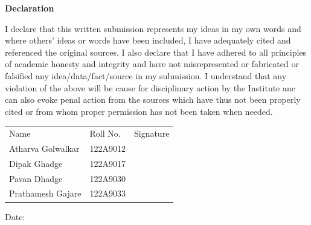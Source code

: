 \begin{center}
    \fontsize{25pt}{18pt} {\textbf{Declaration}}
\end{center}

\vspace{0.5 in}

\noindent I declare that this written submission represents my ideas in my own words and where others' ideas or words have been included, I have adequately cited and referenced the original sources. I also declare that I have adhered to all principles of academic honesty and integrity and have not misrepresented or fabricated or falsified any idea/data/fact/source in my submission. I understand that any violation of the above will be cause for disciplinary action by the Institute anc can also evoke penal action from the sources which have thus not been properly cited or from whom proper permission has not been taken when needed.

\vspace{1cm}

\begin{center}
    \noindent \begin{tabular}{lll}
        \vspace{5pt}Name & \hspace{15pt}Roll No. & \hspace{10pt} Signature\\
        \vspace{5pt}Atharva Golwalkar & \hspace{15pt}122A9012 \\ 
        \vspace{5pt}Dipak Ghadge & \hspace{15pt}122A9017\\
        \vspace{5pt}Pavan Dhadge & \hspace{15pt}122A9030 \\
        \vspace{5pt}Prathamesh Gajare & \hspace{15pt}122A9033 \\
    \end{tabular} 
\end{center}

\vspace{1in}

\noindent Date: